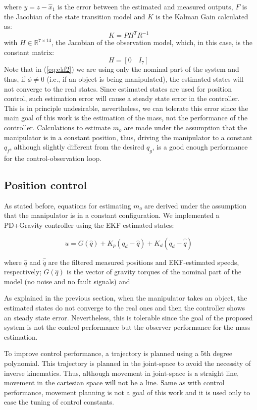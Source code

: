 \documentclass[a4paper, 10pt]{article}
\begin{document}
where $y=z - \hat{x}_1$ is the error between the estimated and measured outputs, $F$ is the Jacobian of the state transition model and $K$ is the Kalman Gain calculated as:
\[
K = PH^TR^{-1}
\]
with $H\in\mathbb{R}^{7\times 14}$, the Jacobian of the observation model, which, in this case, is the constant matrix:
\[
H = \left[0\quad I_7\right]
\]
Note that in (\ref{eq:ekf2}) we are using only the nominal part of the system and thus, if $\phi\neq 0$ (i.e., if an object is being manipulated), the estimated states will not converge to the real states. Since estimated states are used for position control, such estimation error will cause a steady state error in the controller. This is in principle undesirable, nevertheless, we can tolerate this error since the main goal of this work is the estimation of the mass, not the performance of the controller. Calculations to estimate $m_o$ are made under the assumption that the manipulator is in a constant position, thus, driving the manipulator to a constant $q_f$, although slightly different from the desired $q_g$, is a good enough performance for the control-observation loop.

\subsection{Position control}
As stated before, equations for estimating $m_o$ are derived under the assumption that the manipulator is in a constant configuration. We implemented a PD+Gravity controller using the EKF estimated states:

\begin{equation}
  u = G(\hat{q}) + K_p(q_d - \hat{q}) + K_d(\dot{q}_d - \hat{\dot{q}})
\end{equation}

where $\hat{q}$ and $\hat{\dot{q}}$ are the filtered measured positions and EKF-estimated speeds, respectively; $G(\hat{q})$ is the vector of gravity torques of the nominal part of the model (no noise and no fault signals) and 

As explained in the previous section, when the manipulator takes an object, the estimated states do not converge to the real ones and then the controller shows an steady state error. Nevertheless, this is tolerable since the goal of the proposed system is not the control performance but the observer performance for the mass estimation.

To improve control performance, a trajectory is planned using a 5th degree polynomial. This trajectory is planned in the joint-space to avoid the necessity of inverse kinematics. Thus, although movement in joint-space is a straight line, movement in the cartesian space will not be a line. Same as with control performance, movement planning is not a goal of this work and it is used only to ease the tuning of control constants.
\end{document}

